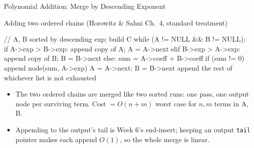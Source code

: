 \documentclass[aspectratio=169]{beamer}
\begin{document}
\begin{frame}[fragile]{Polynomial Addition: Merge by Descending Exponent}
  \begin{block}{Adding two ordered chains (Horowitz \& Sahni Ch.~4, standard
    treatment)
    \cite{HorowitzSahni2008_fundamentals_data_structures}}
\begin{semiverbatim}
// A, B sorted by descending exp; build C
while (A != NULL && B != NULL):
    if   A->exp > B->exp: append copy of A; A = A->next
    elif B->exp > A->exp: append copy of B; B = B->next
    else: sum = A->coeff + B->coeff
          if (sum != 0) append node(sum, A->exp)
          A = A->next; B = B->next
append the rest of whichever list is not exhausted
\end{semiverbatim}
  \end{block}
  \begin{itemize}
    \item The two ordered chains are merged like two sorted runs: one pass,
      one output node per surviving term. Cost $= O(n + m)$ worst case for
      $n, m$ terms in A, B.
    \item Appending to the output's tail is Week 6's end-insert; keeping an
      output \texttt{tail} pointer makes each append $O(1)$, so the whole
      merge is linear.
  \end{itemize}
\end{frame}
\end{document}
